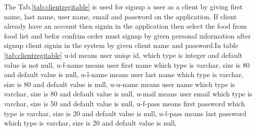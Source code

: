 \documentclass[12pt,a4paper]{article}
\newcommand\tab[1][.7cm]{\hspace*{#1}}
\begin{document}
\begin{table}[H]
\begin{tabular}{M{0.6cm}|M{1.5cm}|M{2cm}|M{1cm}|M{1cm}|M{2.5cm}|M{3.2cm}N}
	\end{tabular}
	\end{table}\tab The Tab.\ref{tab:clientregitable} is used for signup a user as a client by giving first name, last name, user name, email and password on the application. If client already have an account then signin in the application then select the food from food list and befor confrim order must signup by given personal information after signup client signin in the system by given client name and password.In table \ref{tab:clientregitable} u-id means user uniqe id, which type is integer and default value is not null, u-f-name means user first name which type is varchar, size is 80 and default value is null, u-l-name means user last name which type is varchar, size is 80 and default value is null, u-u-name means user name which type is varchar, size is 80 and default value is null, u-mail means user email which type is varchar, size is 50 and default value is null, u-f-pass means first password which type is varchar, size is 20 and default value is null, u-l-pass means last password which type is varchar, size is 20 and default value is null,
\end{document}
